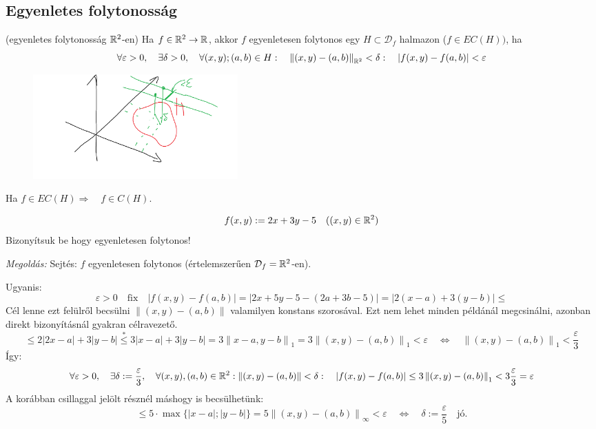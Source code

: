 \documentclass[a4paper,11.5pt]{article}
\newcommand{\norm}[1]{\left\lVert#1\right\rVert}
\begin{document}
	\subsection{Egyenletes folytonosság}
	\begin{revision}
		(egyenletes folytonosság $\mathbb{R}^2$-en) Ha $f\in\mathbb{R}^2\to\mathbb{R}$, akkor $f$ egyenletesen folytonos egy $H\subset \mathcal{D}_f$ halmazon ($f\in EC(H))$, ha
		\[ \forall\varepsilon>0,\quad \exists\delta>0,\quad \forall(x,y);(a,b)\in H:\quad \norm{(x,y)-(a,b)}_{\R^2}<\delta:\quad |f(x,y)-f(a,b)|<\varepsilon \]
		\begin{figure}[H]
			\centering
			\includegraphics[height=4cm]{kepek/52.png}
			\caption{}
		\end{figure}
	\end{revision}
	\begin{revision}
		Ha $f\in EC(H)\Rightarrow\quad f\in C(H)$.
	\end{revision}
	\begin{task}
		\[ f(x,y):=2x+3y-5\quad ((x,y)\in\mathbb{R}^2) \]
		Bizonyítsuk be hogy egyenletesen folytonos!
		
		\textit{Megoldás:} Sejtés: $f$ egyenletesen folytonos (értelemszerűen $\mathcal{D}_f=\mathbb{R}^2$-en).
		
		Ugyanis:
		\[ \varepsilon>0\quad \text{fix}\quad |f(x,y)-f(a,b)|=|2x+5y-5-(2a+3b-5)|=|2(x-a)+3(y-b)|\leq \]
		Cél lenne ezt felülről becsülni $\norm{(x,y)-(a,b)}$ valamilyen konstans szorosával. Ezt nem lehet minden példánál megcsinálni, azonban direkt bizonyításnál gyakran célravezető.
		\[ \leq2|2x-a|+3|y-b|\overset{*}{\leq} 3|x-a|+3|y-b|=3\norm{x-a,y-b}_1=3\norm{(x,y)-(a,b)}_1<\varepsilon\quad \Leftrightarrow\quad \norm{(x,y)-(a,b)}_1<\frac{\varepsilon}{3}  \]
		Így:
		\[ \forall\varepsilon>0,\quad \exists\delta:=\frac{\varepsilon}{3},\quad \forall(x,y),(a,b)\in\R^2 : \norm{(x,y)-(a,b)}<\delta:\quad |f(x,y)-f(a,b)|\leq 3\norm{(x,y)-(a,b)}_1<3\frac{\varepsilon}{3}=\varepsilon  \]
		A korábban csillaggal jelölt résznél máshogy is becsülhetünk:
		\[ \leq 5\cdot\max\{ |x-a|;|y-b|\}=5\norm{(x,y)-(a,b)}_\infty<\varepsilon\quad \Leftrightarrow\quad \delta:=\frac{\varepsilon}{5}\quad \text{jó.} \]
		
	\end{task}
\end{document}
